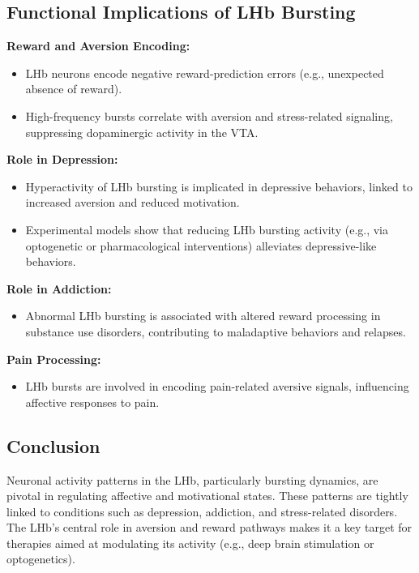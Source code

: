 \documentclass[a4paper,9pt]{extarticle}
\begin{document}
\subsection{Functional Implications of LHb Bursting}
\textbf{Reward and Aversion Encoding:}
\begin{itemize}
    \item LHb neurons encode negative reward-prediction errors (e.g., unexpected absence of reward).
    \item High-frequency bursts correlate with aversion and stress-related signaling, suppressing dopaminergic activity in the VTA.
\end{itemize}

\textbf{Role in Depression:}
\begin{itemize}
    \item Hyperactivity of LHb bursting is implicated in depressive behaviors, linked to increased aversion and reduced motivation.
    \item Experimental models show that reducing LHb bursting activity (e.g., via optogenetic or pharmacological interventions) alleviates depressive-like behaviors.
\end{itemize}

\textbf{Role in Addiction:}
\begin{itemize}
    \item Abnormal LHb bursting is associated with altered reward processing in substance use disorders, contributing to maladaptive behaviors and relapses.
\end{itemize}

\textbf{Pain Processing:}
\begin{itemize}
    \item LHb bursts are involved in encoding pain-related aversive signals, influencing affective responses to pain.
\end{itemize}

\subsection{Conclusion}

Neuronal activity patterns in the LHb, particularly bursting dynamics, are pivotal in regulating affective and motivational states. These patterns are tightly linked to conditions such as depression, addiction, and stress-related disorders. The LHb's central role in aversion and reward pathways makes it a key target for therapies aimed at modulating its activity (e.g., deep brain stimulation or optogenetics).
\end{document}
